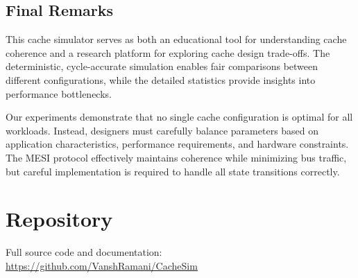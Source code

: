 \documentclass[11pt]{article}
\begin{document}
\subsection{Final Remarks}

This cache simulator serves as both an educational tool for understanding cache coherence and a research platform for exploring cache design trade-offs. The deterministic, cycle-accurate simulation enables fair comparisons between different configurations, while the detailed statistics provide insights into performance bottlenecks.

Our experiments demonstrate that no single cache configuration is optimal for all workloads. Instead, designers must carefully balance parameters based on application characteristics, performance requirements, and hardware constraints. The MESI protocol effectively maintains coherence while minimizing bus traffic, but careful implementation is required to handle all state transitions correctly.

\section{Repository}
Full source code and documentation: \\
\url{https://github.com/VanshRamani/CacheSim}
\end{document}
